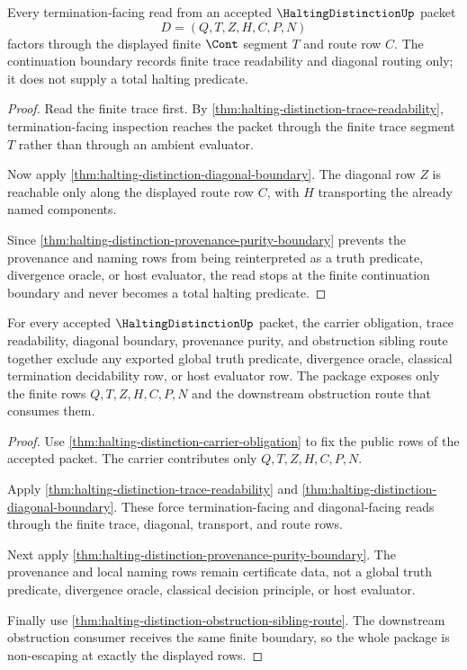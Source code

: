 \begin{theorem}
\label{thm:halting-distinction-continuation-boundary}
Every termination-facing read from an accepted $\HaltingDistinctionUp$ packet
$$
D=(Q,T,Z,H,C,P,N)
$$
factors through the displayed finite $\Cont$ segment $T$ and route row $C$. The continuation boundary records finite trace readability and diagonal routing only; it does not supply a total halting predicate.
\end{theorem}
\begin{proof}
Read the finite trace first. By \autoref{thm:halting-distinction-trace-readability}, termination-facing inspection reaches the packet through the finite trace segment $T$ rather than through an ambient evaluator.

Now apply \autoref{thm:halting-distinction-diagonal-boundary}. The diagonal row $Z$ is reachable only along the displayed route row $C$, with $H$ transporting the already named components.

Since \autoref{thm:halting-distinction-provenance-purity-boundary} prevents the provenance and naming rows from being reinterpreted as a truth predicate, divergence oracle, or host evaluator, the read stops at the finite continuation boundary and never becomes a total halting predicate.
\end{proof}

\begin{theorem}
\label{thm:halting-distinction-nonescape}
For every accepted $\HaltingDistinctionUp$ packet, the carrier obligation, trace readability, diagonal boundary, provenance purity, and obstruction sibling route together exclude any exported global truth predicate, divergence oracle, classical termination decidability row, or host evaluator row. The package exposes only the finite rows $Q,T,Z,H,C,P,N$ and the downstream obstruction route that consumes them.
\end{theorem}
\begin{proof}
Use \autoref{thm:halting-distinction-carrier-obligation} to fix the public rows of the accepted packet. The carrier contributes only $Q,T,Z,H,C,P,N$.

Apply \autoref{thm:halting-distinction-trace-readability} and \autoref{thm:halting-distinction-diagonal-boundary}. These force termination-facing and diagonal-facing reads through the finite trace, diagonal, transport, and route rows.

Next apply \autoref{thm:halting-distinction-provenance-purity-boundary}. The provenance and local naming rows remain certificate data, not a global truth predicate, divergence oracle, classical decision principle, or host evaluator.

Finally use \autoref{thm:halting-distinction-obstruction-sibling-route}. The downstream obstruction consumer receives the same finite boundary, so the whole package is non-escaping at exactly the displayed rows.
\end{proof}

